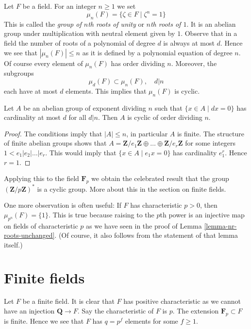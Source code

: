 \noindent
Let $F$ be a field. For an integer $n \geq 1$ we set
$$
\mu_n(F) = \{\zeta \in F \mid \zeta^n = 1\}
$$
This is called the {\it group of $n$th roots of unity} or
{\it $n$th roots of $1$}. It is an abelian group under multiplication
with neutral element given by $1$.
Observe that in a field the number of roots of a polynomial of degree $d$
is always at most $d$. Hence we see that $|\mu_n(F)| \leq n$
as it is defined by a polynomial equation of degree $n$.
Of course every element of $\mu_n(F)$ has order dividing $n$.
Moreover, the subgroups
$$
\mu_d(F) \subset \mu_n(F),\quad d | n
$$
each have at most $d$ elements. This implies that $\mu_n(F)$ is cyclic.

\begin{lemma}
\label{lemma-cyclic}
Let $A$ be an abelian group of exponent dividing $n$ such that
$\{x \in A \mid dx = 0\}$ has cardinality at most $d$ for all $d | n$.
Then $A$ is cyclic of order dividing $n$.
\end{lemma}

\begin{proof}
The conditions imply that $|A| \leq n$, in particular $A$ is finite.
The structure of finite abelian groups shows that
$A = \mathbf{Z}/e_1\mathbf{Z} \oplus \ldots \oplus \mathbf{Z}/e_r\mathbf{Z}$
for some integers $1 < e_1 | e_2 | \ldots | e_r$. This would imply
that $\{x \in A \mid e_1 x = 0\}$ has cardinality $e_1^r$. Hence
$r = 1$.
\end{proof}

\noindent
Applying this to the field $\mathbf{F}_p$ we obtain the celebrated result
that the group $(\mathbf{Z}/p\mathbf{Z})^*$ is a cyclic group. More about
this in the section on finite fields.

\medskip\noindent
One more observation is often useful: If $F$ has characteristic
$p > 0$, then $\mu_{p^n}(F) = \{1\}$. This is true because raising
to the $p$th power is an injective map on fields of characteristic $p$
as we have seen in the proof of Lemma \ref{lemma-nr-roots-unchanged}.
(Of course, it also follows from the statement of that lemma itself.)






\section{Finite fields}
\label{section-finite}

\noindent
Let $F$ be a finite field. It is clear that $F$ has positive characteristic
as we cannot have an injection $\mathbf{Q} \to F$. Say the characteristic
of $F$ is $p$. The extension $\mathbf{F}_p \subset F$ is finite.
Hence we see that $F$ has $q = p^f$ elements for some $f \geq 1$.

